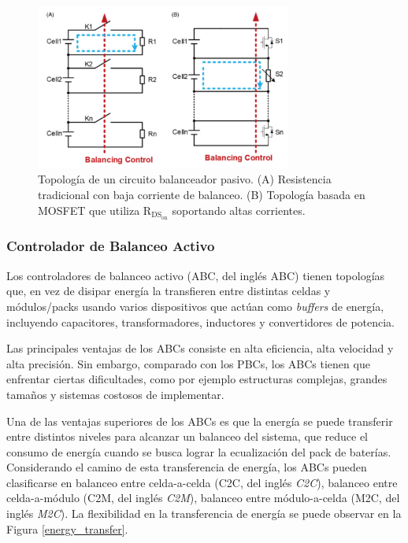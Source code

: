 \documentclass[10pt,a4paper]{article}
\newcounter{subsubsubsection}[subsubsection]
\begin{document}
\begin{figure}[h!]
    \begin{center}
        \includegraphics[width=0.75\textwidth]{passive_eq_top.png}
        \caption{Topolog\'ia de un circuito balanceador pasivo. (A) Resistencia
        tradicional con baja corriente de balanceo. (B) Topolog\'ia basada en
        MOSFET que utiliza $\mathrm{R_{DS_{on}}}$ soportando altas corrientes.}
        \label{passive_eq_top}
    \end{center}
\end{figure}

\subsubsection{Controlador de Balanceo Activo}

Los controladores de balanceo activo (\acrshort{ABC}, del ingl\'es \acrlong{ABC})
tienen topolog\'ias que, en vez de disipar energ\'ia la transfieren entre
distintas celdas y m\'odulos/packs usando varios dispositivos que act\'uan como
\emph{buffers} de energ\'ia, incluyendo capacitores, transformadores, inductores
y convertidores de potencia.

Las principales ventajas de los \acrshort{ABC}s consiste en alta eficiencia,
alta velocidad y alta precisi\'on. Sin embargo, comparado con los 
\acrshort{PBC}s, los \acrshort{ABC}s tienen que enfrentar ciertas dificultades, 
como por ejemplo estructuras complejas, grandes tamaños y sistemas costosos de 
implementar.


Una de las ventajas superiores de los \acrshort{ABC}s es que la energ\'ia se
puede transferir entre distintos niveles para alcanzar un balanceo del sistema,
que reduce el consumo de energ\'ia cuando se busca lograr la ecualizaci\'on del
pack de bater\'ias. Considerando el camino de esta transferencia de energ\'ia,
los \acrshort{ABC}s pueden clasificarse en balanceo entre celda-a-celda
(\acrshort{C2C}, del ingl\'es \emph{\acrlong{C2C}}), balanceo entre
celda-a-m\'odulo (\acrshort{C2M}, del ingl\'es \emph{\acrlong{C2M}}), balanceo
entre m\'odulo-a-celda (\acrshort{M2C}, del ingl\'es \emph{\acrlong{M2C}}). La
flexibilidad en la transferencia de energ\'ia se puede observar en la Figura
\ref{energy_transfer}.
\end{document}
